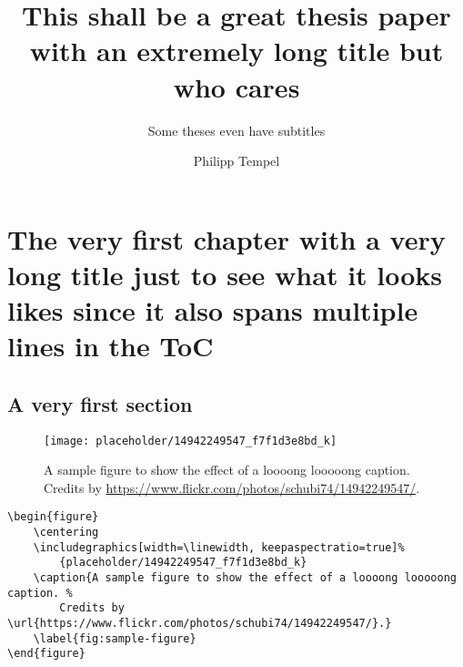 \documentclass[%
    thesis=ma, %
    language=american, %
    paper=a4,%
]{isw}
\title{This shall be a great thesis paper with an extremely long title but who cares}
\subtitle{Some theses even have subtitles}
\author{Philipp Tempel}
\begin{document}
    \maketitle
    
    \begin{otherlanguage}{ngerman}\maketitle \end{otherlanguage}
    
    \tableofcontents
    
    \listoffigures
    
    \listoftables
    
    \chapter[The short title of the chapter showing up in the TOC and the page headers]{The very first chapter with a very long title just to see what it looks likes since it also spans multiple lines in the ToC}
    
    \section{A very first section}
    
    \begin{figure}
        \centering
        \texttt{[image: placeholder/14942249547\_f7f1d3e8bd\_k]}
        \caption{A sample figure to show the effect of a loooong looooong caption. Credits by \url{https://www.flickr.com/photos/schubi74/14942249547/}.}
        \label{fig:sample-figure}
    \end{figure}
    
    \begin{listing}
        \begin{verbatim}
\begin{figure}
    \centering
    \includegraphics[width=\linewidth, keepaspectratio=true]%
        {placeholder/14942249547_f7f1d3e8bd_k}
    \caption{A sample figure to show the effect of a loooong looooong caption. %
        Credits by \url{https://www.flickr.com/photos/schubi74/14942249547/}.}
    \label{fig:sample-figure}
\end{figure}
        \end{verbatim}
        \caption{Sample code for \cref{fig:sample-figure}}
        \label{lst:sample-code}
    \end{listing}
    
\end{document}
